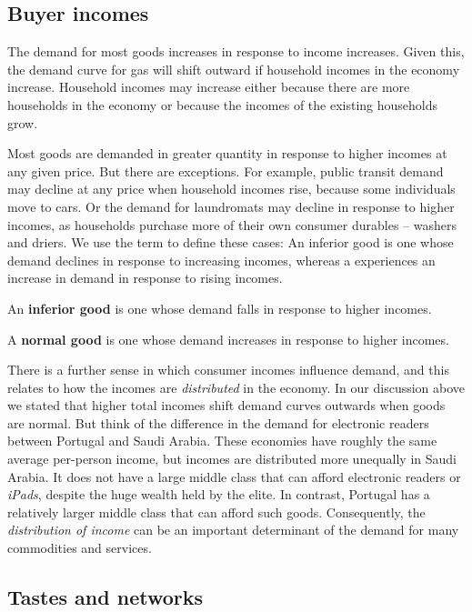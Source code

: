 \subsection*{Buyer incomes}

The demand for most goods increases in response to income increases. Given this, the demand curve for gas will shift outward if household incomes in the economy increase. Household incomes may increase either because there are more households in the economy or because the incomes of the existing households grow. 

Most goods are demanded in greater quantity in response to higher incomes at any given price. But there are exceptions. For example, public transit demand may decline at any price when household incomes rise, because some individuals move to cars. Or the demand for laundromats may decline in response to higher incomes, as households purchase more of their own consumer durables -- washers and driers. We use the term  to define these cases: An inferior good is one whose demand declines in response to increasing incomes, whereas a  experiences an increase in demand in response to rising incomes.

\begin{DefBox}
An \textbf{inferior good} is one whose demand falls in response to higher incomes.

A \textbf{normal good} is one whose demand increases in response to higher incomes.
\end{DefBox}

There is a further sense in which consumer incomes influence demand, and this relates to how the incomes are \textit{distributed} in the economy. In our discussion above we stated that higher total incomes shift demand curves outwards when goods are normal. But think of the difference in the demand for electronic readers between Portugal and Saudi Arabia. These economies have roughly the same average per-person income, but incomes are distributed more unequally in Saudi Arabia. It does not have a large middle class that can afford electronic readers or \textit{iPads}, despite the huge wealth held by the elite. In contrast, Portugal has a relatively larger middle class that can afford such goods. Consequently, the \textit{distribution of income} can be an important determinant of the demand for many commodities and services.

\subsection*{Tastes and networks}

